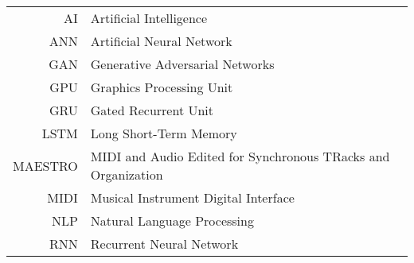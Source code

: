 \documentclass[english,bachelor,unicode]{ctufit-thesis}
\theoremstyle{plain}
\theoremstyle{definition}
\theoremstyle{remark}
\numberwithin{theorem}{chapter}
\begin{document}
    \begin{tabular}{rl}
        AI      & Artificial Intelligence                                       \\
        ANN     & Artificial Neural Network                                     \\
        GAN     & Generative Adversarial Networks                               \\
        GPU     & Graphics Processing Unit                                      \\
        GRU     & Gated Recurrent Unit                                          \\
        LSTM    & Long Short-Term Memory                                        \\
        MAESTRO & MIDI and Audio Edited for Synchronous TRacks and Organization \\
        MIDI    & Musical Instrument Digital Interface                          \\
        NLP     & Natural Language Processing                                   \\
        RNN     & Recurrent Neural Network
    \end{tabular}

    \mainmatter\mainmatterinit %



    \appendix\appendixinit %


    \backmatter %

    \printbibliography %

\end{document}
